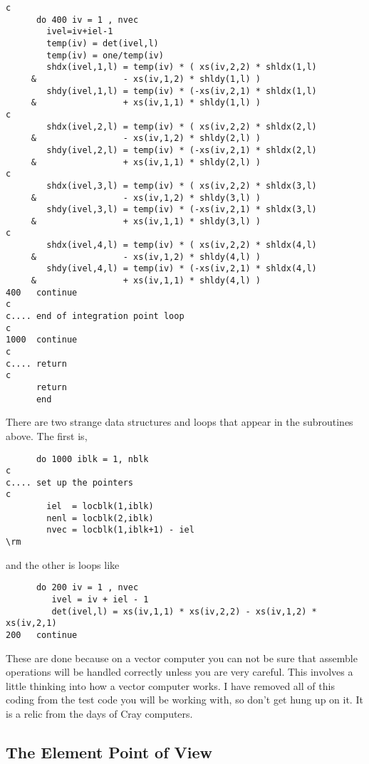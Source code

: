 \documentclass{article}
\begin{document}
\begin{verbatim}
c
      do 400 iv = 1 , nvec
        ivel=iv+iel-1
        temp(iv) = det(ivel,l)
        temp(iv) = one/temp(iv)
        shdx(ivel,1,l) = temp(iv) * ( xs(iv,2,2) * shldx(1,l)
     &                 - xs(iv,1,2) * shldy(1,l) )
        shdy(ivel,1,l) = temp(iv) * (-xs(iv,2,1) * shldx(1,l)
     &                 + xs(iv,1,1) * shldy(1,l) ) 
c
        shdx(ivel,2,l) = temp(iv) * ( xs(iv,2,2) * shldx(2,l)
     &                 - xs(iv,1,2) * shldy(2,l) )
        shdy(ivel,2,l) = temp(iv) * (-xs(iv,2,1) * shldx(2,l)
     &                 + xs(iv,1,1) * shldy(2,l) ) 
c
        shdx(ivel,3,l) = temp(iv) * ( xs(iv,2,2) * shldx(3,l)
     &                 - xs(iv,1,2) * shldy(3,l) )
        shdy(ivel,3,l) = temp(iv) * (-xs(iv,2,1) * shldx(3,l)
     &                 + xs(iv,1,1) * shldy(3,l) ) 
c
        shdx(ivel,4,l) = temp(iv) * ( xs(iv,2,2) * shldx(4,l)
     &                 - xs(iv,1,2) * shldy(4,l) )
        shdy(ivel,4,l) = temp(iv) * (-xs(iv,2,1) * shldx(4,l)
     &                 + xs(iv,1,1) * shldy(4,l) ) 
400   continue 
c 
c.... end of integration point loop 
c 
1000  continue 
c 
c.... return 
c
      return
      end
\end{verbatim}
\rm
\clearpage

There are two strange data structures and loops that appear in the subroutines
above.   The first is,
\tt\begin{verbatim}
      do 1000 iblk = 1, nblk  
c  
c.... set up the pointers  
c
        iel  = locblk(1,iblk)
        nenl = locblk(2,iblk)
        nvec = locblk(1,iblk+1) - iel
\rm
\end{verbatim}
and the other is loops like
\tt\begin{verbatim}
      do 200 iv = 1 , nvec
         ivel = iv + iel - 1
         det(ivel,l) = xs(iv,1,1) * xs(iv,2,2) - xs(iv,1,2) * xs(iv,2,1)  
200   continue 
\end{verbatim}\rm
These are done because on a vector computer you can not be sure that assemble
operations will be handled correctly unless you are very careful.   This
involves a little thinking into how a vector computer works.    I have removed all of this
coding from the test code you will be working with, so don't get hung up on it.
It is a relic from the days of Cray computers.

\clearpage

\subsection{The Element Point of View}
\end{document}
